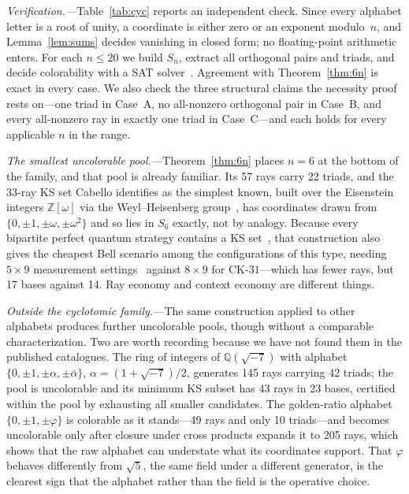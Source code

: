 \documentclass[twocolumn,prl,superscriptaddress,nofootinbib]{revtex4-2}
\newcommand{\Z}{\mathbb{Z}}
\newcommand{\Q}{\mathbb{Q}}
\newcommand{\CK}{\mathrm{CK}\text{-}31}
\begin{document}
\textit{Verification.---}Table~\ref{tab:cyc} reports an independent check.  Since
every alphabet letter is a root of unity, a coordinate is either zero or an
exponent modulo~$n$, and Lemma~\ref{lem:sums} decides vanishing in closed form;
no floating-point arithmetic enters.  For each $n\leq20$ we build $S_n$, extract
all orthogonal pairs and triads, and decide colorability with a SAT
solver~\cite{AudemardSimon2018}.  Agreement with Theorem~\ref{thm:6n} is exact in
every case.  We also check the three structural claims the necessity proof rests
on---one triad in Case~A, no all-nonzero orthogonal pair in Case~B, and every
all-nonzero ray in exactly one triad in Case~C---and each holds for every
applicable $n$ in the range.

\textit{The smallest uncolorable pool.---}Theorem~\ref{thm:6n} places $n=6$ at
the bottom of the family, and that pool is already familiar.  Its 57 rays carry
22 triads, and the 33-ray KS set Cabello identifies as the simplest known,
built over the Eisenstein integers $\Z[\omega]$ via the Weyl--Heisenberg
group~\cite{Cabello2025simplest}, has coordinates drawn from
$\{0,\pm1,\pm\omega,\pm\omega^2\}$ and so lies in $S_6$ exactly, not by analogy.
Because every bipartite perfect quantum strategy contains a KS
set~\cite{Cabello2024bipartite}, that construction also gives the cheapest Bell
scenario among the configurations of this type, needing $5\times9$ measurement
settings~\cite{TrandafirCabello2025optimal} against $8\times9$ for $\CK$---which
has fewer rays, but 17 bases against 14.  Ray economy and context economy are
different things.

\textit{Outside the cyclotomic family.---}The same construction applied to other
alphabets produces further uncolorable pools, though without a comparable
characterization.  Two are worth recording because we have not found them in the
published catalogues.  The ring of integers of $\Q(\sqrt{-7})$ with alphabet
$\{0,\pm1,\pm\alpha,\pm\bar\alpha\}$, $\alpha=(1+\sqrt{-7})/2$, generates 145
rays carrying 42 triads; the pool is uncolorable and its minimum KS subset has
43 rays in 23 bases, certified within the pool by exhausting all smaller
candidates.  The golden-ratio alphabet $\{0,\pm1,\pm\varphi\}$ is colorable as it
stands---49 rays and only 10 triads---and becomes uncolorable only after closure
under cross products expands it to 205 rays, which shows that the raw alphabet
can understate what its coordinates support.  That $\varphi$ behaves differently
from $\sqrt5$, the same field under a different generator, is the clearest sign
that the alphabet rather than the field is the operative choice.
\end{document}
